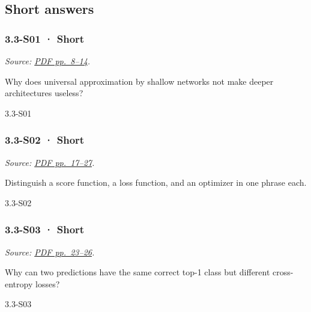 \subsection{Short answers}\label{short-answers-9}

\noindent\begin{minipage}{\linewidth}

\subsubsection{3.3-S01 · Short}\label{s01-short-9}

\emph{Source:
\href{../Lecture\%20Slides/3.3.\%20Deep\%20Learning\%20Fundamentals.pdf\#page=8}{PDF
pp.~8--14}.}

Why does universal approximation by shallow networks not make deeper
architectures useless?

\begin{solution}[20mm]{3.3-S01}

\end{solution}
\end{minipage}\par\medskip

\noindent\begin{minipage}{\linewidth}

\subsubsection{3.3-S02 · Short}\label{s02-short-9}

\emph{Source:
\href{../Lecture\%20Slides/3.3.\%20Deep\%20Learning\%20Fundamentals.pdf\#page=17}{PDF
pp.~17--27}.}

Distinguish a score function, a loss function, and an optimizer in one
phrase each.

\begin{solution}[20mm]{3.3-S02}

\end{solution}
\end{minipage}\par\medskip

\noindent\begin{minipage}{\linewidth}

\subsubsection{3.3-S03 · Short}\label{s03-short-9}

\emph{Source:
\href{../Lecture\%20Slides/3.3.\%20Deep\%20Learning\%20Fundamentals.pdf\#page=23}{PDF
pp.~23--26}.}

Why can two predictions have the same correct top-1 class but different
cross-entropy losses?

\begin{solution}[20mm]{3.3-S03}

\end{solution}
\end{minipage}\par\medskip

